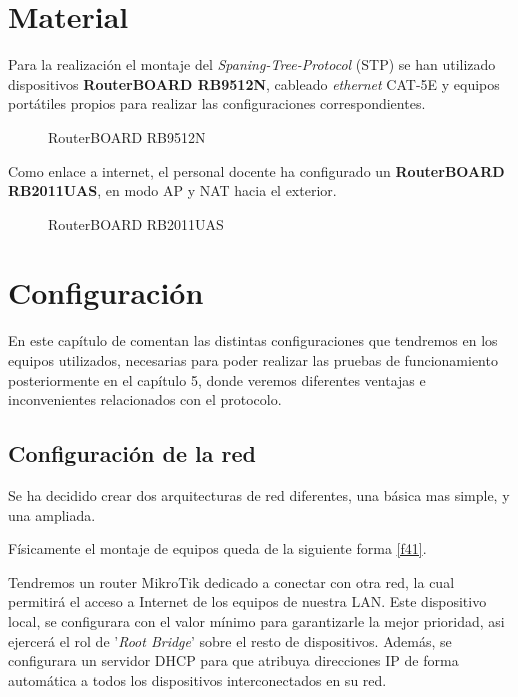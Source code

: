 
\chapter{Material}
\label{material}

Para la realización el montaje del \textit{Spaning-Tree-Protocol} (STP) se han utilizado dispositivos \textbf{RouterBOARD RB9512N}, cableado \textit{ethernet} CAT-5E y equipos portátiles propios para realizar las configuraciones correspondientes.

\begin{figure}[h!]\centering
	\caption{RouterBOARD RB9512N}
	\label{rboard}
	\bigskip
\end{figure}

Como enlace a internet, el personal docente ha configurado un \textbf{RouterBOARD RB2011UAS}, en modo AP y NAT hacia el exterior.

\begin{figure}[h!]\centering
	\caption{RouterBOARD RB2011UAS}
	\label{rboard2}
	\bigskip
\end{figure}

\chapter{Configuración}
\label{cap4}

En este capítulo de comentan las distintas configuraciones que tendremos en los equipos utilizados, necesarias para poder realizar las pruebas de funcionamiento posteriormente en el capítulo 5, donde veremos diferentes ventajas e inconvenientes relacionados con el protocolo.

\section{Configuración de la red}

Se ha decidido crear dos arquitecturas de red diferentes, una básica mas simple, y una ampliada.

Físicamente el montaje de equipos queda de la siguiente forma \autoref{f41}.

Tendremos un router MikroTik dedicado a conectar con otra red, la cual permitirá el acceso a Internet de los equipos de nuestra LAN. Este dispositivo local, se configurara con el valor mínimo para garantizarle la mejor prioridad, asi ejercerá el rol de '\textit{Root Bridge}' sobre el resto de dispositivos. Además, se configurara un servidor DHCP para que atribuya direcciones IP de forma automática a todos los dispositivos interconectados en su red.

